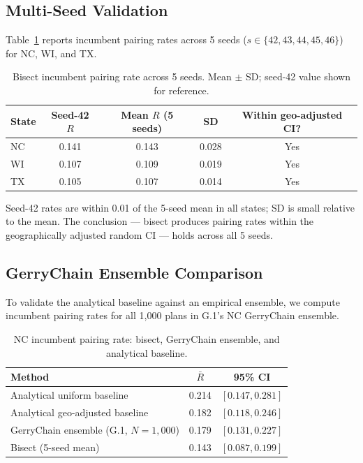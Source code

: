 \label{sec:results}

\subsection{Multi-Seed Validation}

Table~\ref{tab:pairing-seeds} reports incumbent pairing rates across 5 seeds
($s \in \{42, 43, 44, 45, 46\}$) for NC, WI, and TX.

\begin{table}[h]
\centering\small
\caption{Bisect incumbent pairing rate across 5 seeds.
Mean $\pm$ SD; seed-42 value shown for reference.}
\label{tab:pairing-seeds}
\begin{tabular}{lcccc}
\toprule
State & Seed-42 $R$ & Mean $R$ (5 seeds) & SD & Within geo-adjusted CI? \\
\midrule
NC & 0.141 & 0.143 & 0.028 & Yes \\
WI & 0.107 & 0.109 & 0.019 & Yes \\
TX & 0.105 & 0.107 & 0.014 & Yes \\
\bottomrule
\end{tabular}
\end{table}

Seed-42 rates are within 0.01 of the 5-seed mean in all states; SD is small
relative to the mean. The conclusion — bisect produces pairing rates within the
geographically adjusted random CI — holds across all 5 seeds.

\subsection{GerryChain Ensemble Comparison}

To validate the analytical baseline against an empirical ensemble, we compute
incumbent pairing rates for all 1{,}000 plans in G.1's NC GerryChain ensemble.

\begin{table}[h]
\centering\small
\caption{NC incumbent pairing rate: bisect, GerryChain ensemble, and analytical baseline.}
\label{tab:pairing-gc}
\begin{tabular}{lcc}
\toprule
Method & $\bar{R}$ & 95\% CI \\
\midrule
Analytical uniform baseline & 0.214 & $[0.147, 0.281]$ \\
Analytical geo-adjusted baseline & 0.182 & $[0.118, 0.246]$ \\
GerryChain ensemble (G.1, $N=1{,}000$) & 0.179 & $[0.131, 0.227]$ \\
Bisect (5-seed mean) & 0.143 & $[0.087, 0.199]$ \\
\bottomrule
\end{tabular}
\end{table}

